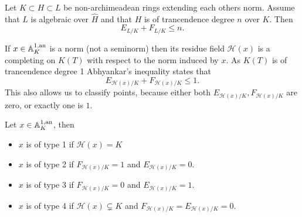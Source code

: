 \begin{theorem}
	Let $K \subset H \subset L$ be non-archimeadean rings extending each others norm. Assume that $L$ is algebraic over $\hat{H}$ and that $H$ is of trancendence degree $n$ over $K$. Then \[
	E_{L / K} + F_{L / K}  \le n
	.\] 
\end{theorem}

If $x \in \mathbb{A}_K^{1, \text{an}}$ is a norm (not a seminorm) then its residue field $\mathcal{H} (x)$ is a completing on $K(T)$ with respect to the norm induced by $x$. As $K(T)$ is of trancendence degree 1 Abhyankar's inequality states that \[
	E_{\mathcal{H} (x) / K} + F_{\mathcal{H} (x) / K} \le 1
.\] 
This also allows us to classify points, because either both $E_{\mathcal{H} (x) / K}, F_{\mathcal{H} (x) / K}$ are zero, or exactly one is $1$. 
\begin{proposition}
	Let $x \in \mathbb{A}_K^{1, \text{an}}$, then 
	\begin{itemize}
		\item $x$ is of type 1 if $\mathcal{H} (x) = K$
		\item $x$ is of type 2 if $F_{\mathcal{H} (x) / K} = 1$ and $E_{\mathcal{H} (x) / K} = 0$. 
		\item $x$ is of type 3 if $F_{\mathcal{H} (x) / K} = 0$ and $E_{\mathcal{H} (x) / K} = 1$.
		\item $x$ is of type 4 if $\mathcal{H} (x) \subsetneq K$ and  $F_{\mathcal{H} (x) / K} = E_{\mathcal{H} (x) / K} = 0$.
	\end{itemize}
\end{proposition}

